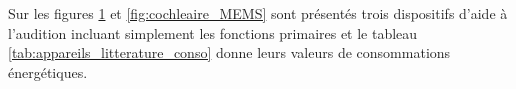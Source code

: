 \begin{table}[!htbp]
\begin{minipage}[c]{0.5\textwidth}
\begin{figure}[H]
\begin{center}
				\label{fig:appareils_litterature}
			\end{center}
		\end{figure}
	\end{minipage}
	\hfillx
	\begin{minipage}[c]{0.4\textwidth}
		\caption{Consommation énergétique des appareils proposés dans la littérature}
		\label{tab:appareils_litterature_conso}
	\end{minipage}
\end{table}
Sur les figures \ref{fig:appareils_litterature} et \ref{fig:cochleaire_MEMS} sont présentés trois dispositifs d'aide à l'audition incluant simplement les fonctions primaires et le tableau \ref{tab:appareils_litterature_conso} donne leurs valeurs de consommations énergétiques.

